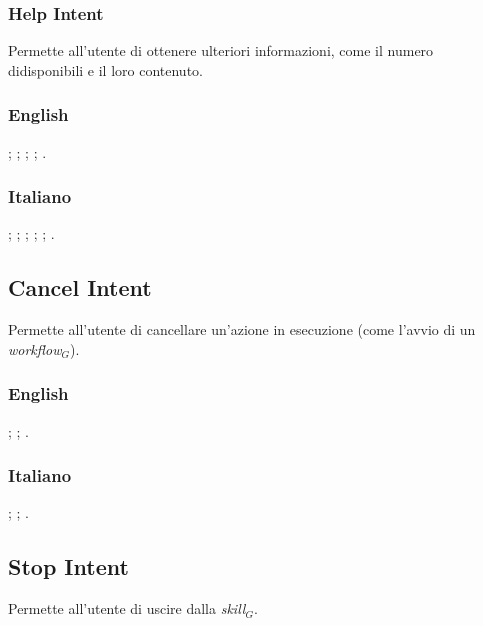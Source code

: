 \subsubsection{Help Intent}\label{help}
Permette all'utente di ottenere ulteriori informazioni, come il numero didisponibili e il loro contenuto.
\subsubsection{English}
\begin{itemize}
	;
	;
	;
	;
	.	
\end{itemize}
\subsubsection{Italiano}
\begin{itemize}
	;
	;
	;
	;
	;
	.
\end{itemize}

\subsection{Cancel Intent}
Permette all'utente di cancellare un'azione in esecuzione (come l'avvio di un \textit{workflow$_{G}$}).
\subsubsection{English}
\begin{itemize}
	;
	;
	.
\end{itemize}

\subsubsection{Italiano}
\begin{itemize}
	;
	;
	.
\end{itemize}

\subsection{Stop Intent}
Permette all'utente di uscire dalla \textit{skill$_{G}$}.
